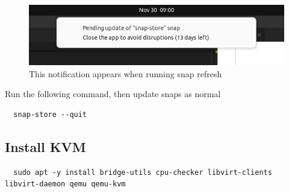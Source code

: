 \documentclass[a4paper, 12pt]{article}
\begin{document}
\begin{figure}[h]
  \centering
  \includegraphics[width=0.6\linewidth]{images/snap_error.png}
  \caption{This notification appears when running snap refresh}
\end{figure}

Run the following command, then update snaps as normal

\begin{lstlisting}
  snap-store --quit
\end{lstlisting}

\subsection{Install KVM}

\begin{lstlisting}
  sudo apt -y install bridge-utils cpu-checker libvirt-clients libvirt-daemon qemu qemu-kvm
\end{lstlisting}

\printbibliography
\end{document}
